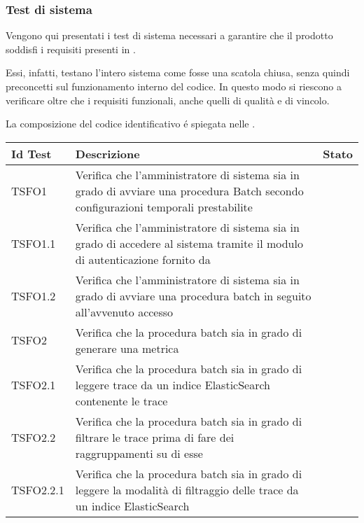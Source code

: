 \subsubsection{Test di sistema} \label{sistema}
	Vengono qui presentati i test di sistema necessari a garantire che il prodotto 	soddisfi i requisiti presenti in \vAnalisiDeiRequisiti{}.

	Essi, infatti, testano l'intero sistema come fosse una scatola chiusa, senza quindi preconcetti sul funzionamento interno del codice.
	In questo modo si riescono a verificare oltre che i requisiti funzionali, anche quelli di qualità e di vincolo.
	
	La composizione del codice identificativo é spiegata nelle \vNormeDiProgetto{}.
		
			\begin{center}
   			\begin{longtable}{ | >{\centering\arraybackslash}m{2.5cm} | >{\raggedright\arraybackslash}m{9cm} | >{\centering\arraybackslash}m{3.5cm} | }
        
        	\hline
        		\textbf{Id Test} & \textbf{Descrizione} & \textbf{Stato} \\ \hline
        	\endhead
        	
        		TSFO1 & Verifica che l'amministratore di sistema sia in grado 
        				di avviare una procedura Batch secondo configurazioni 
        				temporali prestabilite
        				 & \donetext{} \\ \hline
        				 
        		TSFO1.1 & Verifica che l'amministratore di sistema sia in grado
        					di accedere al sistema tramite il modulo di autenticazione
        				 fornito da \Proponente{}
        				& \donetext{} \\ \hline
        				
        		TSFO1.2 & Verifica che l'amministratore di sistema sia in grado di avviare
        		 una procedura batch in seguito all'avvenuto accesso & \donetext{} \\ \hline
        				
        		TSFO2  & Verifica che la procedura batch sia in grado di generare una
        					metrica
        					& \donetext{} \\ \hline
        		
				
				TSFO2.1 & Verifica che la procedura batch sia in grado di 
							leggere trace da un indice ElasticSearch contenente 
							le trace 
						& \donetext{} \\ \hline
				TSFO2.2 & Verifica che la procedura batch sia in grado di filtrare 
							le trace prima di fare dei raggruppamenti su di esse 
						& \donetext{} \\ \hline
				TSFO2.2.1 & Verifica che la procedura batch sia in grado di leggere la modalità di
							filtraggio delle trace da un indice ElasticSearch 
							& \donetext{} \\ \hline
							

\end{longtable}
\end{center}
